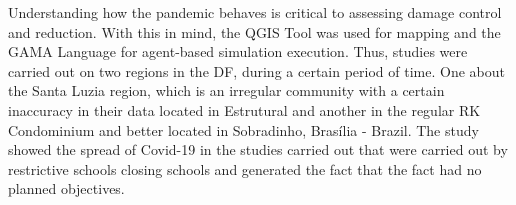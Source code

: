 Understanding how the pandemic behaves is critical to assessing damage control and reduction. With this in mind, the QGIS Tool was used for mapping and the GAMA Language for agent-based simulation execution. Thus, studies were carried out on two regions in the DF, during a certain period of time. One about the Santa Luzia region, which is an irregular community with a certain inaccuracy in their data located in Estrutural and another in the regular RK Condominium and better located in Sobradinho, Brasília - Brazil. The study showed the spread of Covid-19 in the studies carried out that were carried out by restrictive schools closing schools and generated the fact that the fact had no planned objectives.